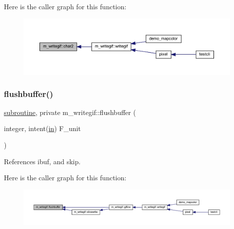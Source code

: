 Here is the caller graph for this function\+:
\nopagebreak
\begin{figure}[H]
\begin{center}
\leavevmode
\includegraphics[width=350pt]{namespacem__writegif_a79ebbfd4c7df8520a82c75c3a62f0c96_icgraph}
\end{center}
\end{figure}
\mbox{\label{namespacem__writegif_a48c5ca5487be9dbe565c0d4f8aa02d0d}} 
\subsubsection{\texorpdfstring{flushbuffer()}{flushbuffer()}}
{\footnotesize\ttfamily \hyperlink{M__stopwatch_83_8txt_acfbcff50169d691ff02d4a123ed70482}{subroutine}, private m\+\_\+writegif\+::flushbuffer (\begin{DoxyParamCaption}\item[{integer, intent(\hyperlink{M__journal_83_8txt_afce72651d1eed785a2132bee863b2f38}{in})}]{F\+\_\+unit }\end{DoxyParamCaption})\hspace{0.3cm}{\ttfamily [private]}}



References ibuf, and skip.

Here is the caller graph for this function\+:
\nopagebreak
\begin{figure}[H]
\begin{center}
\leavevmode
\includegraphics[width=350pt]{namespacem__writegif_a48c5ca5487be9dbe565c0d4f8aa02d0d_icgraph}
\end{center}
\end{figure}
\mbox{\label{namespacem__writegif_a13c09be69495f4ba21ecb7c134216a17}} 
